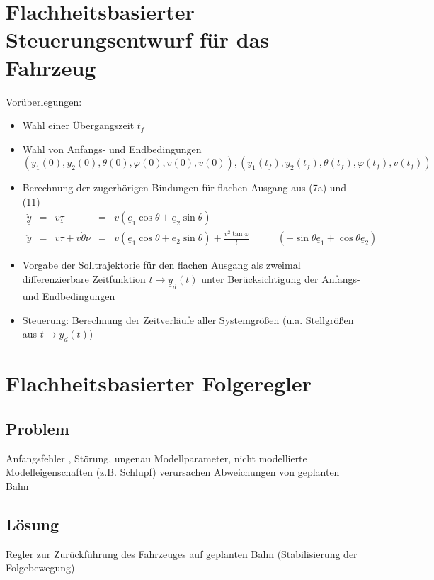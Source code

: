\documentclass[ngerman]{tudscrreprt}
\begin{document}
\section*{Flachheitsbasierter Steuerungsentwurf für das Fahrzeug} 
Vorüberlegungen:
\begin{itemize}
\item Wahl einer Übergangszeit $t_f$
\item Wahl von Anfangs- und Endbedingungen 
\begin{equation*}
(y_1(0), y_2(0), \theta(0), \varphi(0), v(0), \dot{v}(0)), (y_1(t_f), y_2(t_f), \theta(t_f),\varphi(t_f), \dot v (t_f))
\end{equation*}
\item Berechnung der zugerhörigen Bindungen für flachen Ausgang aus (7a) und (11)
\begin{equation*}
\begin{matrix}
\dot{\underline y} &=& v \underline \tau &=& v(\underline e_1 \cos{\theta} + \underline e_2 \sin{\theta})&\\ 
\ddot{\underline y}&=& \dot v \tau + v \dot \theta \nu &=& \dot v (\underline e_1 \cos{\theta} + e_2 \sin{\theta} ) + \frac{v^2 \tan{\varphi}}{l}& \qquad (-\sin{\theta} \underline e_1 + \cos{\theta} \underline e_2)
\end{matrix}
\end{equation*}
\item Vorgabe der Solltrajektorie für den flachen Ausgang als zweimal differenzierbare Zeitfunktion $t \to \underline y_d(t)$ unter Berücksichtigung der Anfangs- und Endbedingungen
\item Steuerung: Berechnung der Zeitverläufe aller Systemgrößen (u.a. Stellgrößen aus $t \to y_d (t)$)
\end{itemize}
\section*{Flachheitsbasierter Folgeregler}
\subsection*{Problem} Anfangsfehler , Störung, ungenau Modellparameter, nicht modellierte Modelleigenschaften (z.B. Schlupf) verursachen Abweichungen von geplanten Bahn 
\subsection*{Lösung} Regler zur Zurückführung des Fahrzeuges auf geplanten Bahn (Stabilisierung der Folgebewegung)
\end{document}
